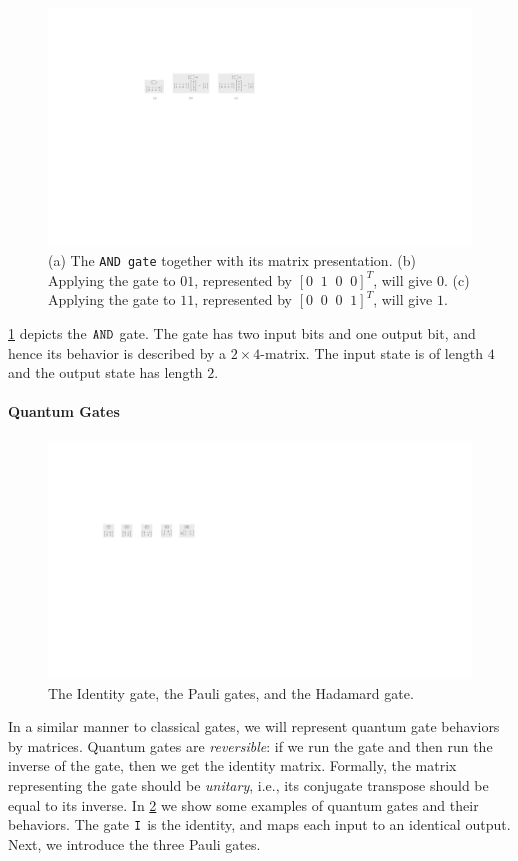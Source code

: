 \begin{figure} 
\includegraphics[scale=0.7]{Figures/Gates/and} 
\caption{(a) The {\tt AND gate} together with its matrix presentation.
(b) Applying the gate to $01$, represented by $[0\;\;1\;\;0\;\;0]^T$, will give $0$. 
(c) Applying the gate to $11$, represented by $[0\;\;0\;\;0\;\;1]^T$, will give $1$.}
\label{and:gate:fig}
\end{figure}
%
\cref{and:gate:fig} depicts the $\mathtt{AND}$ gate.
%
The gate has two input bits and one output bit, and hence its behavior is described by a $2\times4$-matrix.
%
The input state is of length $4$ and the output state has length $2$.

\paragraph{Quantum Gates}
\begin{figure} 
\includegraphics[scale=0.7]{Figures/Gates/qgates} 
\caption{The Identity gate, the Pauli gates, and the Hadamard gate.}
\label{qgates:fig} 
\end{figure}
In a similar manner to classical gates, we will represent quantum gate behaviors by matrices.
%
Quantum gates are {\it reversible}: if we run the gate and then run the inverse of the gate, then we get the identity matrix.
%
Formally, the matrix representing the gate should be {\it unitary}, i.e., its conjugate transpose should be equal to its inverse.
%
In \cref{qgates:fig} we show some examples of quantum gates and their behaviors.
%
The gate $\mathtt{I}$ is the identity, and maps each input to an identical output.
%
Next, we introduce the three Pauli gates.

